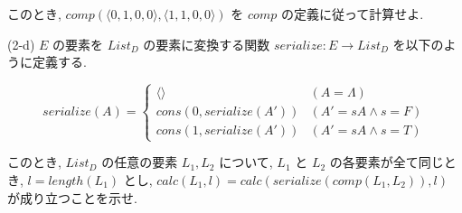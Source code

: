 \documentclass[12pt]{article}
\numberwithin{equation}{section}
\begin{document}
\begin{flushleft}
このとき, \( comp(\langle 0, 1, 0, 0 \rangle, \langle 1, 1, 0, 0 \rangle) \) を \( comp \) の定義に従って計算せよ.

\vspace{5mm}

(2-d) \( E \) の要素を \( List_D \) の要素に変換する関数 \( serialize: E \to List_D \) を以下のように定義する.

\[
    serialize(A) = \begin{cases}
        \langle \rangle & (A = \Lambda) \\
        cons(0, serialize(A')) & (A' = sA \wedge s = F) \\
        cons(1, serialize(A')) & (A' = sA \wedge s = T)
    \end{cases}
\]

このとき, \( List_D \) の任意の要素 \( L_1, L_2 \) について, \( L_1 \) と \( L_2 \) の各要素が全て同じとき, \( l = length(L_1) \) とし,  \( calc(L_1, l) = calc(serialize(comp(L_1, L_2)), l) \) が成り立つことを示せ.

\end{flushleft}
 
\end{document}
